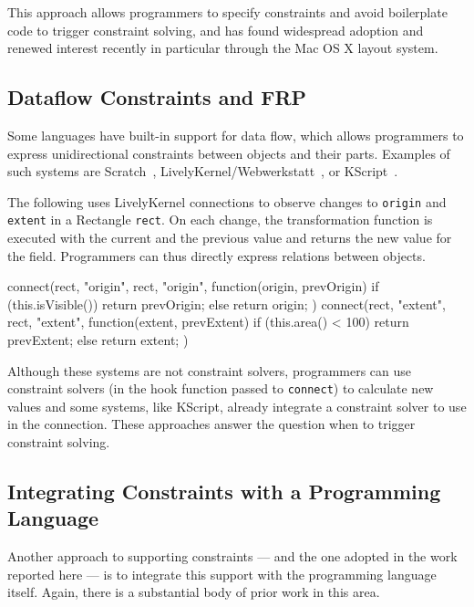 This approach allows programmers to specify constraints and avoid
boilerplate code to trigger constraint solving, and has found
widespread adoption and renewed interest recently in particular
through the Mac OS X layout system.

\subsection{Dataflow Constraints and FRP}

Some languages have built-in support for data flow, which allows
programmers to express unidirectional constraints between objects and
their parts. Examples of such systems are
Scratch~\cite{resnick2009scratch},
LivelyKernel/Webwerkstatt~\cite{lincke2012lively}, or
KScript~\cite{ohshima2012report}.

The following uses LivelyKernel connections to observe changes to
\texttt{origin} and \texttt{extent} in a Rectangle \texttt{rect}.  On
each change, the transformation function is executed with the current
and the previous value and returns the new value for the
field. Programmers can thus directly express relations between
objects.
\begin{code}[language=java]
connect(rect, "origin", rect, "origin",
        function(origin, prevOrigin) {
            if (this.isVisible()) return prevOrigin;
            else return origin;
        })
connect(rect, "extent", rect, "extent",
        function(extent, prevExtent) {
            if (this.area() < 100) return prevExtent;
            else return extent;
        })
\end{code}

Although these systems are not constraint solvers, programmers can use
constraint solvers (in the hook function passed to
\lstinline{connect}) to calculate new values and some systems, like
KScript, already integrate a constraint solver to use in the
connection. These approaches answer the question when to trigger
constraint solving.

\subsection{Integrating Constraints with a Programming Language}

Another approach to supporting constraints --- and the one adopted in
the work reported here --- is to integrate this support with the
programming language itself.  Again, there is a substantial body of
prior work in this area.  

